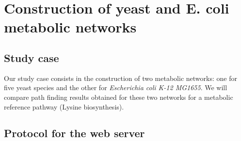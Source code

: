 \section{Construction of yeast and E. coli metabolic networks}

\subsection{Study case}

Our study case consists in the construction of two metabolic networks: one for five yeast species and the other for
\textit{Escherichia coli K-12 MG1655}.
We will compare path finding results obtained for these two networks for a metabolic reference pathway (Lysine biosynthesis).

\subsection{Protocol for the web server}

